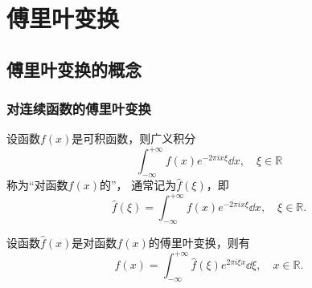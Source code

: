\chapter{傅里叶变换}
\section{傅里叶变换的概念}
\subsection{对连续函数的傅里叶变换}
\begin{definition}
设函数\(f(x)\)是可积函数，则广义积分\[
    \int_{-\infty}^{+\infty}
    f(x) e^{-2 \pi i x \xi}
    \dd{x},
    \quad \xi \in \mathbb{R}
\]
称为“对函数\(f(x)\)的”，
通常记为\(\hat{f}(\xi)\)，即\[
\hat{f}(\xi) = \int_{-\infty}^{+\infty} f(x) e^{-2 \pi i x \xi} \dd{x}, \quad \xi \in \mathbb{R}.
\]
\end{definition}

\begin{theorem}
设函数\(\hat{f}(x)\)是对函数\(f(x)\)的傅里叶变换，则有\[
f(x) = \int_{-\infty}^{+\infty} \hat{f}(\xi) e^{2 \pi i \xi x} \dd{\xi}, \quad x \in \mathbb{R}.
\]
\end{theorem}
